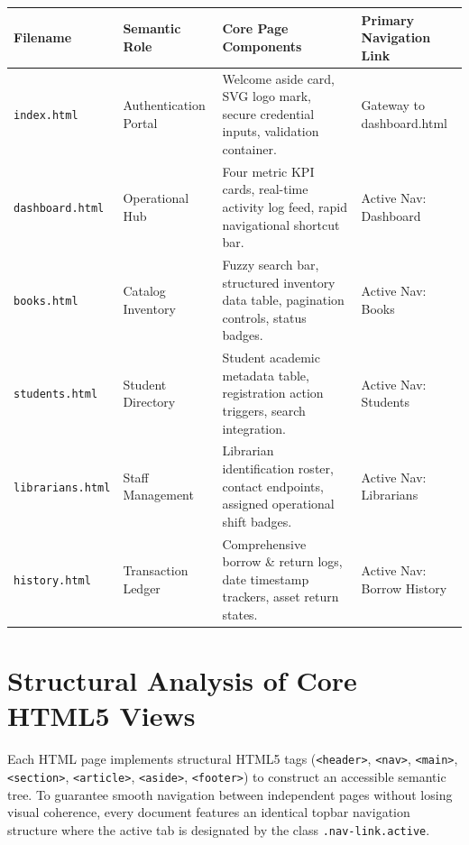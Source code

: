 \documentclass[11pt,a4paper]{report}
\begin{document}
\vspace{10pt}
\noindent
\begin{center}
\renewcommand{\arraystretch}{1.3}
\begin{tabular}{|L{2.5cm}|L{3.2cm}|L{6.0cm}|L{3.3cm}|}
\hline
{}
\textbf{\color{white}Filename} & \textbf{\color{white}Semantic Role} & \textbf{\color{white}Core Page Components} & \textbf{\color{white}Primary Navigation Link} \\
\hline
\texttt{index.html} & Authentication Portal & Welcome aside card, SVG logo mark, secure credential inputs, validation container. & Gateway to dashboard.html \\
\hline
{}
\texttt{dashboard.html} & Operational Hub & Four metric KPI cards, real-time activity log feed, rapid navigational shortcut bar. & Active Nav: Dashboard \\
\hline
\texttt{books.html} & Catalog Inventory & Fuzzy search bar, structured inventory data table, pagination controls, status badges. & Active Nav: Books \\
\hline
{}
\texttt{students.html} & Student Directory & Student academic metadata table, registration action triggers, search integration. & Active Nav: Students \\
\hline
\texttt{librarians.html} & Staff Management & Librarian identification roster, contact endpoints, assigned operational shift badges. & Active Nav: Librarians \\
\hline
{}
\texttt{history.html} & Transaction Ledger & Comprehensive borrow \& return logs, date timestamp trackers, asset return states. & Active Nav: Borrow History \\
\hline
\end{tabular}
\end{center}

\section{Structural Analysis of Core HTML5 Views}
Each HTML page implements structural HTML5 tags (\texttt{<header>}, \texttt{<nav>}, \texttt{<main>}, \texttt{<section>}, \texttt{<article>}, \texttt{<aside>}, \texttt{<footer>}) to construct an accessible semantic tree. To guarantee smooth navigation between independent pages without losing visual coherence, every document features an identical topbar navigation structure where the active tab is designated by the class \texttt{.nav-link.active}.
\end{document}
